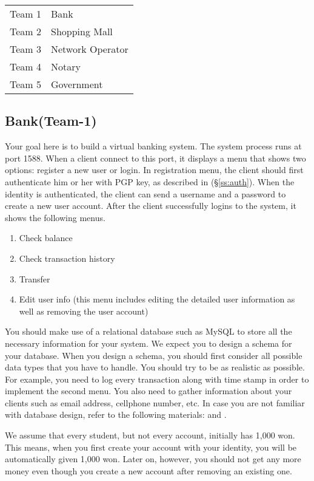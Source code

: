 \documentclass[a4paper, 11pt]{article}
\newcommand*{\Modone}{Bank\xspace}%
\newcommand*{\Modtwo}{Shopping Mall\xspace}%
\newcommand*{\Modthree}{Network Operator\xspace}%
\newcommand*{\Modfour}{Notary\xspace}%
\newcommand*{\Modfive}{Government\xspace}%
\theoremstyle{definition}
\begin{document}
{\begin{center}
  \begin{tabular}{ll}
    Team 1 & \Modone \\
    Team 2 & \Modtwo \\
    Team 3 & \Modthree \\
    Team 4 & \Modfour \\
    Team 5 & \Modfive \\
  \end{tabular}
\end{center}

\subsection{\Modone (Team-1)} \label{ss:modone}

Your goal here is to build a virtual banking system. The system
process runs at port 1588. When a client connect to this port, it
displays a menu that shows two options: register a new user or login.
In registration menu, the client should first authenticate him or her
with PGP key, as described in (\S\ref{ss:auth}). When the identity is
authenticated, the client can send a username and a password to create
a new user account. After the client successfully logins to the
system, it shows the following menus.

\begin{enumerate}
  \item Check balance
  \item Check transaction history
  \item Transfer
  \item Edit user info (this menu includes editing the detailed user
    information as well as removing the user account)
\end{enumerate}

You should make use of a relational database such as MySQL to store
all the necessary information for your system. We expect you to design
a schema for your database. When you design a schema, you should first
consider all possible data types that you have to handle. You should
try to be as realistic as possible. For example, you need to log every
transaction along with time stamp in order to implement the second
menu. You also need to gather information about your clients such as
email address, cellphone number, etc.
%
In case you are not familiar with database design, refer to the
following materials: \cite{dbdesign} and \cite{dbtutorial}.

We assume that every student, but not every account, initially has
1,000 won. This means, when you first create your account with your
identity, you will be automatically given 1,000 won. Later on,
however, you should not get any more money even though you create a
new account after removing an existing one.

}
\end{document}
